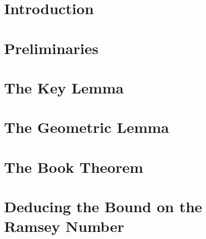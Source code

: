 \section{Introduction}


\section{Preliminaries}


\section{The Key Lemma}


\section{The Geometric Lemma}


\section{The Book Theorem}


\section{Deducing the Bound on the Ramsey Number}


